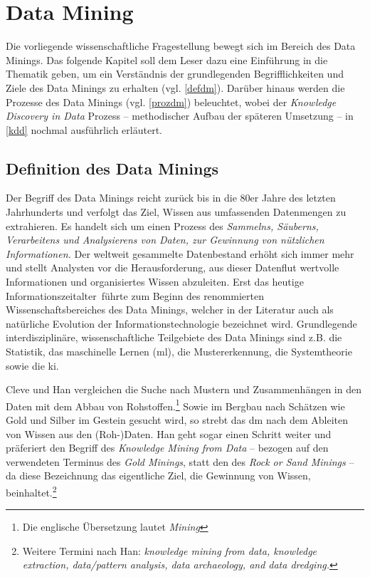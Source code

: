 \section{Data Mining}
\label{dm}
Die vorliegende wissenschaftliche Fragestellung bewegt sich im Bereich des Data Minings. Das folgende Kapitel soll dem Leser dazu eine Einführung in die Thematik geben, um ein Verständnis der grundlegenden Begrifflichkeiten und Ziele des Data Minings zu erhalten (vgl. \vref{defdm}). Darüber hinaus werden die Prozesse des Data Minings (vgl. \vref{prozdm}) beleuchtet, wobei der \textit{Knowledge Discovery in Data} Prozess -- methodischer Aufbau der späteren Umsetzung -- in \vref{kdd} nochmal ausführlich erläutert.

\subsection{Definition des Data Minings}
\label{defdm}

Der Begriff des Data Minings reicht zurück bis in die 80er Jahre des letzten Jahrhunderts und verfolgt das Ziel, Wissen aus umfassenden Datenmengen zu extrahieren. Es handelt sich um einen Prozess des \glqq  \textit{Sammelns, Säuberns, Verarbeitens und Analysierens von Daten, zur Gewinnung von nützlichen Informationen.}\grqq{} Der weltweit gesammelte Datenbestand erhöht sich immer mehr und stellt Analysten vor die Herausforderung, aus dieser Datenflut wertvolle Informationen und organisiertes Wissen abzuleiten. Erst das heutige \glqq Informationszeitalter\grqq~führte zum Beginn des renommierten Wissenschaftsbereiches des Data Minings, welcher in der Literatur auch als natürliche Evolution der Informationstechnologie bezeichnet wird. Grundlegende interdisziplinäre, wissenschaftliche Teilgebiete des Data Minings sind z.B. die Statistik, das maschinelle Lernen (\gls{ml}), die Mustererkennung, die Systemtheorie sowie die \gls{ki}.


Cleve und Han vergleichen die Suche nach Mustern und Zusammenhängen in den Daten mit dem Abbau von Rohstoffen.\footnote{Die englische Übersetzung lautet \textit{\glqq Mining\grqq}} Sowie im Bergbau nach Schätzen wie Gold und Silber im Gestein gesucht wird, so strebt das \gls{dm} nach dem Ableiten von Wissen aus den (Roh-)Daten. Han geht sogar einen Schritt weiter und präferiert den Begriff des \textit{Knowledge Mining from Data} -- bezogen auf den verwendeten Terminus des \textit{Gold Minings}, statt den des \textit{Rock or Sand Minings} -- da diese Bezeichnung das eigentliche Ziel, die Gewinnung von Wissen, beinhaltet.\footnote{Weitere Termini nach Han: \textit{knowledge mining from data, knowledge extraction, data/pattern analysis, data archaeology, and data dredging.}}


